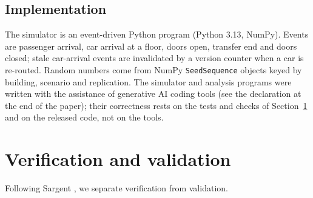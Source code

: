 \documentclass[12pt,a4paper]{article}
\begin{document}
\subsection{Implementation}
The simulator is an event-driven Python program (Python 3.13, NumPy). Events are passenger arrival, car arrival at a floor, doors open, transfer end and doors closed; stale car-arrival events are invalidated by a version counter when a car is re-routed. Random numbers come from NumPy \texttt{SeedSequence} objects keyed by building, scenario and replication. The simulator and analysis programs were written with the assistance of generative AI coding tools (see the declaration at the end of the paper); their correctness rests on the tests and checks of Section~\ref{sec:vv} and on the released code, not on the tools.

\section{Verification and validation}\label{sec:vv}
Following Sargent \cite{sargent2013}, we separate verification from validation.
\end{document}
